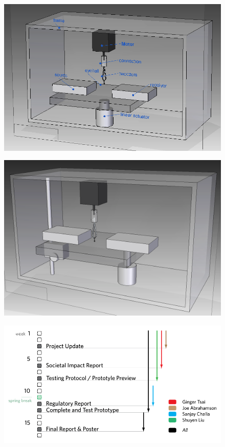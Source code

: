 \documentclass{article}
\begin{document}
\begin{figure}[p]
  \centering
  \includegraphics[width=\linewidth]{../img/render1}
  \label{fig:render1}
\end{figure}

\begin{figure}[p]
  \centering
  \includegraphics[width=\linewidth]{../img/render2}
  \label{fig:render2}
\end{figure}

\begin{figure}[p]
  \centering
  \includegraphics[width=\linewidth]{../img/spring_gantt}
  \label{fig:gantt}
\end{figure}

\newpage


\end{document}
